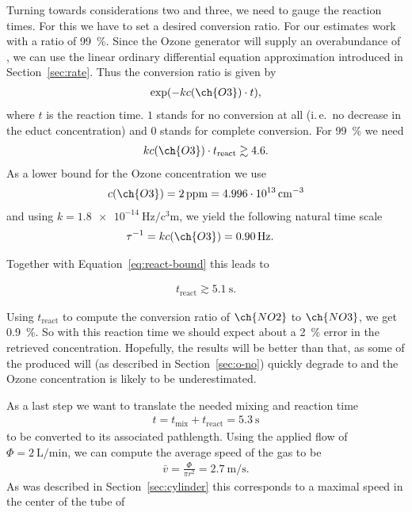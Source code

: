 Turning towards considerations two and three, we need to gauge the
reaction times. For this we have to set a desired conversion
ratio. For our estimates work with a ratio of \SI{99}{\%}. 
Since the Ozone generator will supply an
overabundance of , we can use the linear ordinary
differential equation approximation introduced in
Section~\ref{sec:rate}. Thus the conversion ratio is
given by
\begin{align*}
  \exp(-kc(\ch{O3})\cdot t),
\end{align*}
where $t$ is the reaction time. $1$ stands for no
conversion at all (i.\,e.\ no decrease in the educt concentration) and
$0$ stands for complete conversion. For \SI{99}{\%} we need
\begin{align}
  kc(\ch{O3}) \cdot t_{\text{react}} \gtrsim 4.6. \label{eq:react-bound}
\end{align}
As a lower bound for the Ozone concentration we use
\begin{align*}
  c(\ch{O3}) = \SI{2}{ppm} = \SI{4.996e13}{\per\cubic\centi\meter} 
\end{align*}
and using $k = \SI{1.8e-14}{\hertz\per\cubic\centi\meter}$, we yield
the following natural time scale
\begin{align*}
  \tau^{-1} & = k c(\ch{O3}) = \SI{0.90}{\hertz}.
\end{align*}

Together with Equation~\eqref{eq:react-bound} this leads to

\begin{align*}
  t_{\text{react}} \gtrsim \SI{5.1}{\second}.
\end{align*}

Using $t_{\text{react}}$ to compute the conversion ratio of
$\ch{NO2}$ to $\ch{NO3}$, we get \SI{0.9}{\%}. So with this reaction
time we should expect about a \SI{2}{\%} error in the retrieved
 concentration. Hopefully, the results will be better than
that, as some of the produced  will (as described in
Section~\ref{sec:o-no}) quickly degrade to  and the Ozone
concentration is likely to be underestimated.

As a last step we want to translate the needed mixing and reaction
time
\begin{align*}
  t = t_{\text{mix}} + t_{\text{react}} = \SI{5.3}{\second}
\end{align*}
to be converted to its associated pathlength. Using the applied flow
of $\Phi = \SI{2}{\liter\per\minute}$, we can compute the average
speed of the gas to be
\begin{align*}
  \bar v = \frac{\Phi}{\pi r^2} = \SI{2.7}{\meter\per\second}. 
\end{align*}
As was described in Section~\ref{sec:cylinder} this corresponds to a
maximal speed in the center of the tube of

